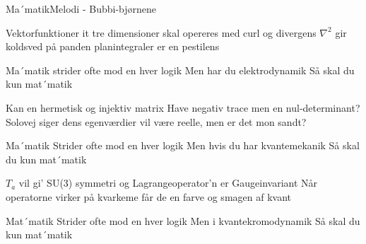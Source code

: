\begin{sang}{Ma´matik}{Melodi - Bubbi-bjørnene}
\begin{vers}
Vektorfunktioner it tre dimensioner
skal opereres med curl og divergens
$\nabla^{2}$ gir koldsved på panden
planintegraler er en pestilens
\end{vers}
\begin{vers}
Ma´matik
strider ofte mod en hver logik
Men har du elektrodynamik
Så skal du kun mat´matik
\end{vers}
\begin{vers}
Kan en hermetisk og injektiv matrix
Have negativ trace men en nul-determinant?
Solovej siger dens egenværdier
vil være reelle, men er det mon sandt?
\end{vers}
\begin{vers}
Ma´matik
Strider ofte mod en hver logik
Men hvis du har kvantemekanik
Så skal du kun mat´matik
\end{vers}
\begin{vers}
$T_{a}$ vil gi' SU(3) symmetri
og Lagrangeoperator'n er Gaugeinvariant
Når operatorne virker på kvarkeme
får de en farve og smagen af kvant
\end{vers}
\begin{vers}
Mat´matik
Strider ofte mod en hver logik
Men i kvantekromodynamik
Så skal du kun mat´matik
\end{vers}
\laps
\end{sang}
